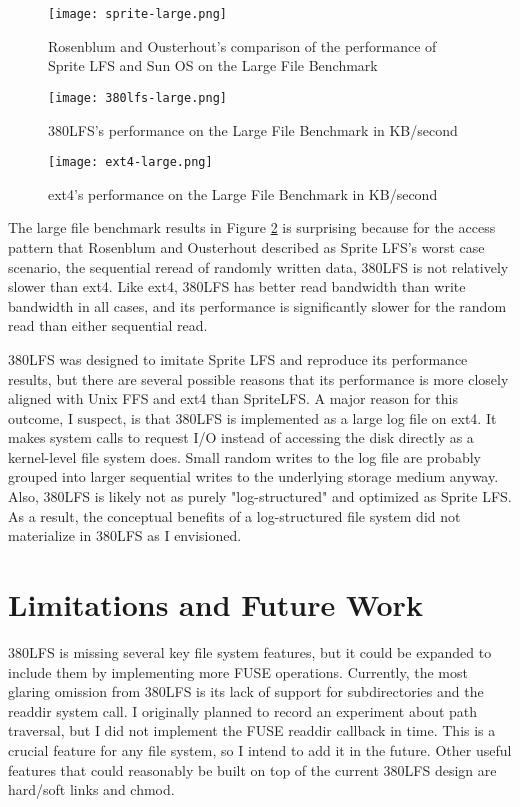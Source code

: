 \documentclass{article}
\begin{document}
\begin{figure}[h!!!!]
    \centering
    \texttt{[image: sprite-large.png]}
    \caption{Rosenblum and Ousterhout's comparison of the performance of Sprite LFS and Sun OS on the Large File Benchmark}
    \label{fig:sprite-large}
\end{figure}
\begin{figure}[h!!!!]
    \centering
    \texttt{[image: 380lfs-large.png]}
    \caption{380LFS's performance on the Large File Benchmark in KB/second}
    \label{fig:380lfs-large}
\end{figure}
\begin{figure}[h!!!!]
    \centering
    \texttt{[image: ext4-large.png]}
    \caption{ext4's performance on the Large File Benchmark in KB/second}
    \label{fig:ext4-large}
\end{figure}

The large file benchmark results in Figure \ref{fig:380lfs-large} is surprising because for the access pattern that Rosenblum and Ousterhout described as Sprite LFS's worst case scenario, the sequential reread of randomly written data, 380LFS is not relatively slower than ext4. Like ext4, 380LFS has better read bandwidth than write bandwidth in all cases, and its performance is significantly slower for the random read than either sequential read.

380LFS was designed to imitate Sprite LFS and reproduce its performance results, but there are several possible reasons that its performance is more closely aligned with Unix FFS and ext4 than SpriteLFS. A major reason for this outcome, I suspect, is that 380LFS is implemented as a large log file on ext4. It makes system calls to request I/O instead of accessing the disk directly as a kernel-level file system does. Small random writes to the log file are probably grouped into larger sequential writes to the underlying storage medium anyway. Also, 380LFS is likely not as purely "log-structured" and optimized as Sprite LFS. As a result, the conceptual benefits of a log-structured file system did not materialize in 380LFS as I envisioned.

\section{Limitations and Future Work}

380LFS is missing several key file system features, but it could be expanded to include them by implementing more FUSE operations. Currently, the most glaring omission from 380LFS is its lack of support for subdirectories and the readdir system call. I originally planned to record an experiment about path traversal, but I did not implement the FUSE readdir callback in time. This is a crucial feature for any file system, so I intend to add it in the future. Other useful features that could reasonably be built on top of the current 380LFS design are hard/soft links and chmod.
\end{document}
